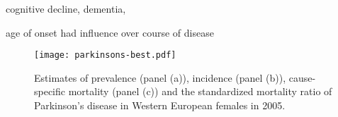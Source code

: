 cognitive decline, dementia,

\cite{poewe_natural_2006}

age of onset had influence over course of disease

    \begin{figure}[h]
        \begin{center}
            \texttt{[image: parkinsons-best.pdf]}
            \caption{Estimates of prevalence (panel (a)), incidence (panel (b)), cause-specific mortality (panel (c)) and the standardized mortality ratio of Parkinson's disease in Western European females in 2005.}
            \label{fig:app-parkinsons fit}
        \end{center}
    \end{figure} 